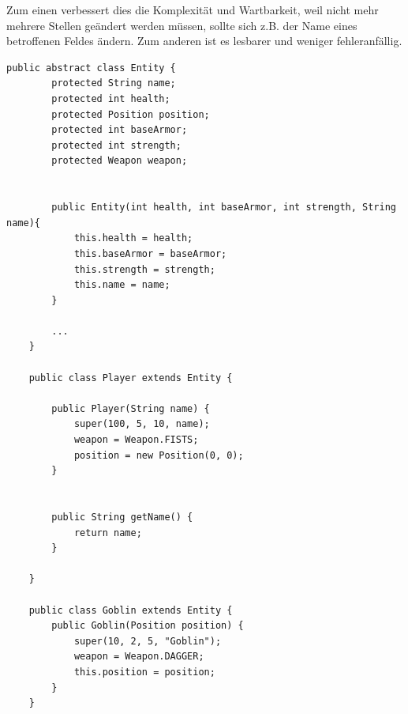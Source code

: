 Zum einen verbessert dies die Komplexität und Wartbarkeit, weil nicht
mehr mehrere Stellen geändert werden müssen, sollte sich z.B. der
Name eines betroffenen Feldes ändern. Zum anderen ist es lesbarer und
weniger fehleranfällig.


\vspace{0.5cm}
\begin{lstlisting}[caption={Don't Repeat Yourself (Vorher)}]
    public abstract class Entity {
        protected String name;
        protected int health;
        protected Position position;
        protected int baseArmor;
        protected int strength;
        protected Weapon weapon;
     
     
        public Entity(int health, int baseArmor, int strength, String name){
            this.health = health;
            this.baseArmor = baseArmor;
            this.strength = strength;
            this.name = name;
        }
        
        ...
    }     

    public class Player extends Entity {

        public Player(String name) {
            super(100, 5, 10, name);
            weapon = Weapon.FISTS;
            position = new Position(0, 0);
        }


        public String getName() {
            return name;
        }

    }

    public class Goblin extends Entity {
        public Goblin(Position position) {
            super(10, 2, 5, "Goblin");
            weapon = Weapon.DAGGER;
            this.position = position;
        }
    }
\end{lstlisting}

